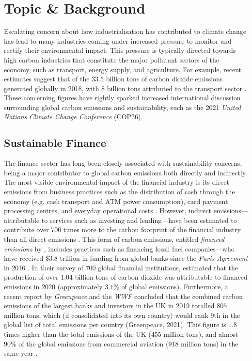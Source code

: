 \documentclass[a4paper, 11pt]{report}
\begin{document}
    \section{Topic \& Background}
    \label{section: topic}

    Escalating concern about how industrialisation has contributed to climate change has lead to many industries coming under increased pressure to monitor and rectify their environmental impact. This pressure is typically directed towards high carbon industries that constitute the major pollutant sectors of the economy, such as transport, energy supply, and agriculture. For example, recent estimates suggest that of the $33.5$ billion tons of carbon dioxide emissions generated globally in 2018, with $8$ billion tons attributed to the transport sector \citep{iea-2022}. These concerning figures have rightly sparked increased international discussion surrounding global carbon emissions and sustainability, such as the 2021 \emph{United Nations Climate Change Conference} (COP26).


    \subsection{Sustainable Finance}

    The finance sector has long been closely associated with sustainability concerns, being a major contributor to global carbon emissions both directly and indirectly. The most visible environmental impact of the financial industry is its direct emissions from business practices such as the distribution of cash through the economy (e.g. cash transport and ATM power consumption), card payment processing centres, and everyday operational costs \citep{hanegraaf-2018}. However, indirect emissions---attributable to services such as investing and lending---have been estimated to contribute over 700 times more to the carbon footprint of the financial industry than all direct emissions \citep{power-2020}. This form of carbon emissions, entitled \emph{financed emissions} by \citet{power-2020}, includes practices such as financing fossil fuel companies---who have received \$3.8 trillion in funding from global banks since the \emph{Paris Agreement} in 2016 \citep{rainforest-2021}. In their survey of $700$ global financial institutions, \citet{power-2020} estimated that the production of over $1.04$ billion tons of carbon dioxide was attributable to financed emissions in 2020 (approximately $3.1\%$ of global emissions). Furthermore, a recent report by \emph{Greenpeace} and the \emph{WWF} concluded that the combined carbon emissions of the largest banks and investors in the UK in 2019 totalled $805$ million tons, which (if consolidated into its own country) would rank 9th in the global list of total emissions per country (Greenpeace, 2021). This figure is $1.8$ times higher than the total emissions of the UK ($455$ million tons), and almost $90\%$ of the global emissions from commercial aviation ($918$ million tons) in the same year \citep{graver-2020}.
\end{document}
